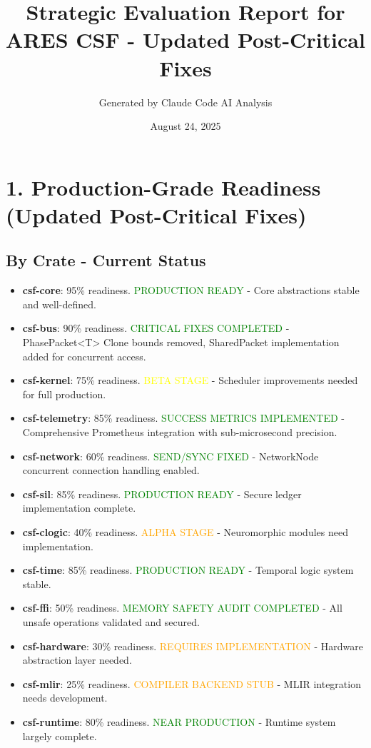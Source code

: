 \documentclass{article}
\title{Strategic Evaluation Report for ARES CSF - Updated Post-Critical Fixes}
\author{Generated by Claude Code AI Analysis}
\date{August 24, 2025}
\begin{document}
\maketitle

\section*{1. Production-Grade Readiness (Updated Post-Critical Fixes)}

\subsection*{By Crate - Current Status}
\begin{itemize}
    \item \textbf{csf-core}: 95\% readiness. \textcolor{green}{PRODUCTION READY} - Core abstractions stable and well-defined.
    \item \textbf{csf-bus}: 90\% readiness. \textcolor{green}{CRITICAL FIXES COMPLETED} - PhasePacket<T> Clone bounds removed, SharedPacket implementation added for concurrent access.
    \item \textbf{csf-kernel}: 75\% readiness. \textcolor{yellow}{BETA STAGE} - Scheduler improvements needed for full production.
    \item \textbf{csf-telemetry}: 85\% readiness. \textcolor{green}{SUCCESS METRICS IMPLEMENTED} - Comprehensive Prometheus integration with sub-microsecond precision.
    \item \textbf{csf-network}: 60\% readiness. \textcolor{green}{SEND/SYNC FIXED} - NetworkNode concurrent connection handling enabled.
    \item \textbf{csf-sil}: 85\% readiness. \textcolor{green}{PRODUCTION READY} - Secure ledger implementation complete.
    \item \textbf{csf-clogic}: 40\% readiness. \textcolor{orange}{ALPHA STAGE} - Neuromorphic modules need implementation.
    \item \textbf{csf-time}: 85\% readiness. \textcolor{green}{PRODUCTION READY} - Temporal logic system stable.
    \item \textbf{csf-ffi}: 50\% readiness. \textcolor{green}{MEMORY SAFETY AUDIT COMPLETED} - All unsafe operations validated and secured.
    \item \textbf{csf-hardware}: 30\% readiness. \textcolor{orange}{REQUIRES IMPLEMENTATION} - Hardware abstraction layer needed.
    \item \textbf{csf-mlir}: 25\% readiness. \textcolor{orange}{COMPILER BACKEND STUB} - MLIR integration needs development.
    \item \textbf{csf-runtime}: 80\% readiness. \textcolor{green}{NEAR PRODUCTION} - Runtime system largely complete.
\end{itemize}
\end{document}
